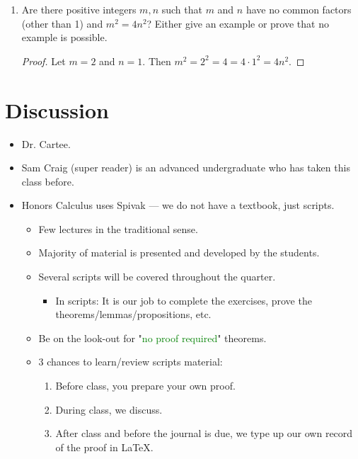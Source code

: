 \documentclass[../main.tex]{subfiles}
\begin{document}
\begin{exerciseM}
\begin{enumerate}[label={\alph*)}]
\begin{proof}
        \end{proof}
        \item Are there positive integers $m,n$ such that $m$ and $n$ have no common factors (other than 1) and $m^2=4n^2$? Either give an example or prove that no example is possible.
        \begin{proof}
            Let $m=2$ and $n=1$. Then $m^2=2^2=4=4\cdot 1^2=4n^2$.
        \end{proof}
    \end{enumerate}
\end{exerciseM}


\section{Discussion}
\begin{itemize}
    \item {}Dr. Cartee.
    \item Sam Craig (super reader) is an advanced undergraduate who has taken this class before.
    \item Honors Calculus uses Spivak --- we do not have a textbook, just scripts.
    \begin{itemize}
        \item Few lectures in the traditional sense.
        \item Majority of material is presented and developed by the students.
        \item Several scripts will be covered throughout the quarter.
        \begin{itemize}
            \item In scripts: It is our job to complete the exercises, prove the theorems/lemmas/propositions, etc.
        \end{itemize}
        \item Be on the look-out for "\textcolor{green}{no proof required}" theorems.
        \item 3 chances to learn/review scripts material:
        \begin{enumerate}
            \item Before class, you prepare your own proof.
            \item During class, we discuss.
            \item After class and before the journal is due, we type up our own record of the proof in \LaTeX.
        \end{enumerate}
    \end{itemize}

\end{itemize}
\end{document}
